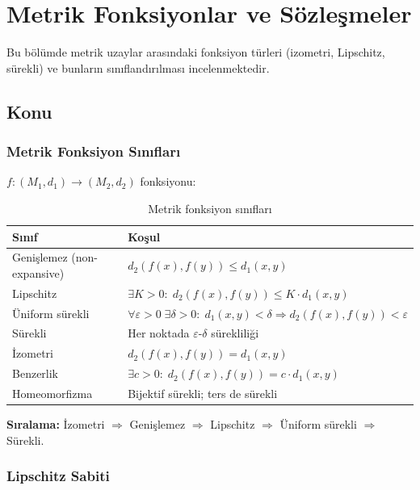 \chapter{Metrik Fonksiyonlar ve Sözleşmeler}

Bu bölümde metrik uzaylar arasındaki fonksiyon türleri (izometri, Lipschitz, sürekli)
ve bunların sınıflandırılması incelenmektedir.

\section{Konu}

\subsection{Metrik Fonksiyon Sınıfları}

$f: (M_1, d_1) \to (M_2, d_2)$ fonksiyonu:

\begin{table}[h]
\centering
\begin{tabular}{ll}
\toprule
\textbf{Sınıf} & \textbf{Koşul} \\
\midrule
Genişlemez (non-expansive) & $d_2(f(x),f(y)) \leq d_1(x,y)$ \\
Lipschitz & $\exists K>0:\; d_2(f(x),f(y)) \leq K \cdot d_1(x,y)$ \\
Üniform sürekli & $\forall\varepsilon>0\;\exists\delta>0:\; d_1(x,y)<\delta \Rightarrow d_2(f(x),f(y))<\varepsilon$ \\
Sürekli & Her noktada $\varepsilon$-$\delta$ sürekliliği \\
İzometri & $d_2(f(x),f(y)) = d_1(x,y)$ \\
Benzerlik & $\exists c>0:\; d_2(f(x),f(y)) = c \cdot d_1(x,y)$ \\
Homeomorfizma & Bijektif sürekli; ters de sürekli \\
\bottomrule
\end{tabular}
\caption{Metrik fonksiyon sınıfları}
\end{table}

\textbf{Sıralama:} İzometri $\Rightarrow$ Genişlemez $\Rightarrow$ Lipschitz
$\Rightarrow$ Üniform sürekli $\Rightarrow$ Sürekli.

\subsection{Lipschitz Sabiti}

